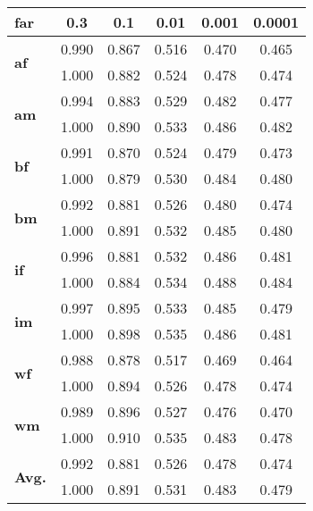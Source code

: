 \begin{center}
\begin{tabular}{l c c c c c}
     \gls{far} & 0.3 & 0.1 & 0.01 & 0.001 & 0.0001\\\midrule
    \multirow{2}{.1mm}{\textbf{\gls{af}}} &0.990 & 0.867 & 0.516 & 0.470 & 0.465\\[-4pt]
        &1.000 & 0.882 & 0.524 & 0.478 & 0.474\\[-1pt]
    \multirow{2}{3mm}{\textbf{\gls{am}}} &0.994 & 0.883 & 0.529 & 0.482 & 0.477\\[-4pt]
        &1.000 & 0.890 & 0.533 & 0.486 & 0.482\\[-1pt]
    \multirow{2}{3mm}{\textbf{\gls{bf}}} &0.991 & 0.870 & 0.524 & 0.479 & 0.473\\[-4pt]
        &1.000 & 0.879 & 0.530 & 0.484 & 0.480\\[-1pt]
    \multirow{2}{3mm}{\textbf{\gls{bm}}} &0.992 & 0.881 & 0.526 & 0.480 & 0.474\\[-4pt]
        &1.000 & 0.891 & 0.532 & 0.485 & 0.480\\[-1pt]
    \multirow{2}{3mm}{\textbf{\gls{if}}} &0.996 & 0.881 & 0.532 & 0.486 & 0.481\\[-4pt]
        &1.000 & 0.884 & 0.534 & 0.488 & 0.484\\[-1pt]
    \multirow{2}{3mm}{\textbf{\gls{im}}} &0.997 & 0.895 & 0.533 & 0.485 & 0.479\\[-4pt]
        &1.000 & 0.898 & 0.535 & 0.486 & 0.481\\[-1pt]
    \multirow{2}{3mm}{\textbf{\gls{wf}}} &0.988 & 0.878 & 0.517 & 0.469 & 0.464\\[-4pt]
        &1.000 & 0.894 & 0.526 & 0.478 & 0.474\\[-1pt]
    \multirow{2}{3mm}{\textbf{\gls{wm}}} &0.989 & 0.896 & 0.527 & 0.476 & 0.470\\[-4pt]
        &1.000 & 0.910 & 0.535 & 0.483 & 0.478\\[-1pt]
    \midrule
    \multirow{2}{3mm}{\textbf{Avg.}} &0.992 & 0.881 & 0.526 & 0.478 & 0.474\\[-4pt]
        &1.000 & 0.891 & 0.531 & 0.483 & 0.479\\[-10pt]
\end{tabular}
\end{center}
